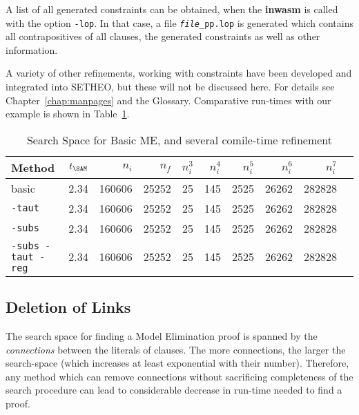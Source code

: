 A list of all generated constraints can be obtained, when the {\bf inwasm}
is called with the option {\tt -lop}. In that case, a file 
{\tt {\em file}\_pp.lop} is generated which contains all contrapositives
of all clauses, the generated constraints as well as other information.

A variety of other refinements, working with constraints have been
developed and integrated into SETHEO, but these will not be discussed
here. For details see Chapter~\ref{chap:manpages} and the Glossary.
Comparative run-times with our example is shown in 
Table~\ref{tab:tut2:results.constr}.

\begin{table}[htb]
\begin{center}
\begin{tabular}{|l|r|r||r|r||r|r|r|r|r|}
\hline
Method & $t_{\SAM}$ & $n_i$ & $n_f$ & 
	$n_i^3$ & $n_i^4$ & $n_i^5$ & $n_i^6$ & $n_i^7$ \\
\hline\hline
basic & 2.34 & 160606 & 25252 &
	25 & 145 & 2525 & 26262 & 282828 \\
\hline
{\tt -taut} & 2.34 & 160606 & 25252 &
	25 & 145 & 2525 & 26262 & 282828 \\
\hline
{\tt -subs} & 2.34 & 160606 & 25252 &
	25 & 145 & 2525 & 26262 & 282828 \\
\hline
{\tt -subs -taut -reg} & 2.34 & 160606 & 25252 &
	25 & 145 & 2525 & 26262 & 282828 \\
\hline\hline
\end{tabular}
\end{center}
\caption{Search Space for Basic ME, and several comile-time
refinement}
\label{tab:tut2:results.constr}
\end{table}

\subsection{Deletion of Links}

The search space for finding a Model Elimination proof is spanned
by the {\em connections\/} between the literals of clauses. The more
connections, the larger the search-space (which increases at least
exponential with their number). Therefore, any method which can
remove connections without sacrificing completeness of the search procedure
can lead to considerable decrease in run-time needed to find a proof.

